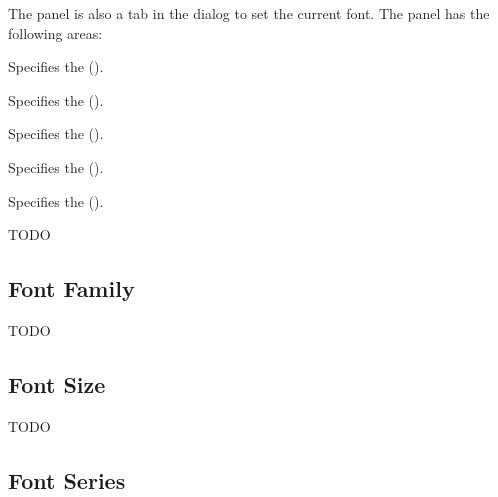 The  panel is also a tab
in the  dialog to set the current
\gls{font}. The panel has the following areas:
\begin{deflist}
\begin{itemdesc}
Specifies the  ().
\end{itemdesc}

\begin{itemdesc}
Specifies the  ().
\end{itemdesc}

\begin{itemdesc}
Specifies the  ().
\end{itemdesc}

\begin{itemdesc}
Specifies the  ().
\end{itemdesc}

\begin{itemdesc}
Specifies the  ().
\end{itemdesc}

\end{deflist}

TODO


\subsection{Font Family}\label{sec:fontfamily}


TODO


\subsection{Font Size}\label{sec:fontsize}


TODO


\subsection{Font Series}\label{sec:fontseries}

